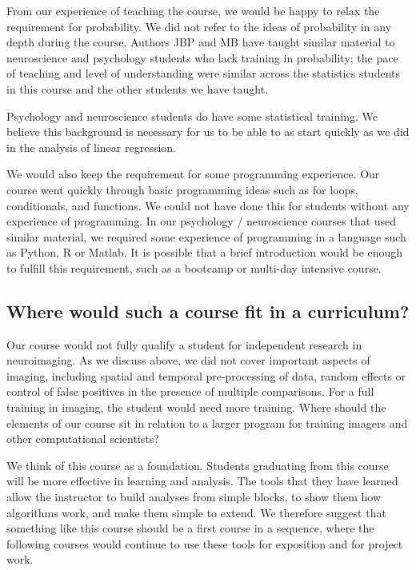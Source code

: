 From our experience of teaching the course, we would be happy to relax the
requirement for probability.  We did not refer to the ideas of
probability in any depth during the course.  Authors JBP and MB have taught
similar material to neuroscience and psychology students who lack training in
probability; the pace of teaching and level of understanding were similar
across the statistics students in this course and the other students we have
taught.

Psychology and neuroscience students do have some statistical training.  We
believe this background is necessary for us to be able to as start quickly as
we did in the analysis of linear regression.

We would also keep the requirement for some programming experience.  Our
course went quickly through basic programming ideas such as for loops,
conditionals, and functions.  We could not have done this for students without
any experience of programming.  In our psychology / neuroscience courses that
used similar material, we required some experience of programming in a
language such as Python, R or Matlab.  It is possible that a brief
introduction would be enough to fulfill this requirement, such as a bootcamp
or multi-day intensive course.

\subsection{Where would such a course fit in a curriculum?}

Our course would not fully qualify a student for independent research in
neuroimaging.  As we discuss above, we did not cover important aspects of
imaging, including spatial and temporal pre-processing of data, random effects
or control of false positives in the presence of multiple comparisons.  For a
full training in imaging, the student would need more training.  Where should
the elements of our course sit in relation to a larger program for training
imagers and other computational scientists?

We think of this course as a foundation.  Students graduating from this course
will be more effective in learning and analysis.  The tools that they have
learned allow the instructor to build analyses from simple blocks, to
show them how algorithms work, and make them simple to extend.  We therefore
suggest that something like this course should be a first course in a
sequence, where the following courses would continue to use these tools for
exposition and for project work.


